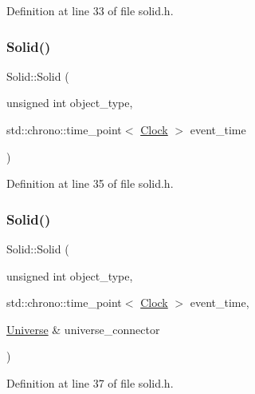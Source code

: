 Definition at line 33 of file solid.\+h.

\mbox{\label{class_solid_a9f5476b751c749af38b349b9fc7e2ba5}} 
\subsubsection{\texorpdfstring{Solid()}{Solid()}\hspace{0.1cm}{\footnotesize\ttfamily [3/4]}}
{\footnotesize\ttfamily Solid\+::\+Solid (\begin{DoxyParamCaption}\item[{unsigned int}]{object\+\_\+type,  }\item[{std\+::chrono\+::time\+\_\+point$<$ \mbox{\hyperlink{universe_8h_a0ef8d951d1ca5ab3cfaf7ab4c7a6fd80}{Clock}} $>$}]{event\+\_\+time }\end{DoxyParamCaption})\hspace{0.3cm}{\ttfamily [inline]}}



Definition at line 35 of file solid.\+h.

\mbox{\label{class_solid_a80746ad255dded6090e648fc3f0dbd93}} 
\subsubsection{\texorpdfstring{Solid()}{Solid()}\hspace{0.1cm}{\footnotesize\ttfamily [4/4]}}
{\footnotesize\ttfamily Solid\+::\+Solid (\begin{DoxyParamCaption}\item[{unsigned int}]{object\+\_\+type,  }\item[{std\+::chrono\+::time\+\_\+point$<$ \mbox{\hyperlink{universe_8h_a0ef8d951d1ca5ab3cfaf7ab4c7a6fd80}{Clock}} $>$}]{event\+\_\+time,  }\item[{\mbox{\hyperlink{class_universe}{Universe}} \&}]{universe\+\_\+connector }\end{DoxyParamCaption})\hspace{0.3cm}{\ttfamily [inline]}}



Definition at line 37 of file solid.\+h.

